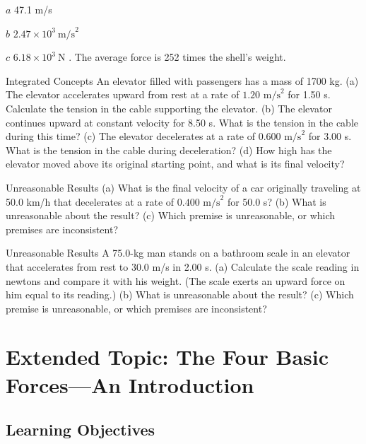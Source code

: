 \documentclass[
]{book}
\begin{document}
\leavevmode{}%
\(a\) 47.1 m/s

\(b\) \({2\text{.}{\text{47} \times \text{10}^{3}}\ \text{m/s}^{2}}{}\)

\(c\) \({6.18 \times \text{10}^{3}}\ \text{N}\) . The average force is 252
times the shell's weight.

\hypertarget{fs-id3028228}{}
\hypertarget{fs-id3012359}{}
{Integrated Concepts} An elevator filled with
passengers has a mass of 1700 kg. (a) The elevator accelerates upward
from rest at a rate of \({1\text{.}\text{20\ m/s}^{2}}{}\) for 1.50 s.
Calculate the tension in the cable supporting the elevator. (b) The
elevator continues upward at constant velocity for 8.50 s. What is the
tension in the cable during this time? (c) The elevator decelerates at a
rate of \({0\text{.}\text{600\ m/s}^{2}}{}\) for 3.00 s. What is the
tension in the cable during deceleration? (d) How high has the elevator
moved above its original starting point, and what is its final velocity?

\hypertarget{fs-id2670683}{}
\hypertarget{fs-id2670686}{}
{Unreasonable Results} (a) What is the final velocity
of a car originally traveling at 50.0 km/h that decelerates at a rate of
\({0\text{.}\text{400\ m/s}^{2}}{}\) for 50.0 s? (b) What is unreasonable
about the result? (c) Which premise is unreasonable, or which premises
are inconsistent?

\hypertarget{fs-id1890360}{}
\hypertarget{fs-id1890362}{}
{Unreasonable Results} A 75.0-kg man stands on a
bathroom scale in an elevator that accelerates from rest to 30.0 m/s in
2.00 s. (a) Calculate the scale reading in newtons and compare it with
his weight. (The scale exerts an upward force on him equal to its
reading.) (b) What is unreasonable about the result? (c) Which premise
is unreasonable, or which premises are inconsistent?

\hypertarget{extended-topic-the-four-basic-forcesan-introduction}{%
\section{Extended Topic: The Four Basic Forces---An Introduction}\label{extended-topic-the-four-basic-forcesan-introduction}}

\hypertarget{fs-id1910513}{}
\hypertarget{learning-objectives-19}{%
\subsection{Learning Objectives}\label{learning-objectives-19}}
\end{document}
